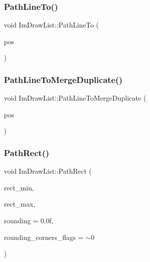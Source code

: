 \hypertarget{struct_im_draw_list_a828d944325ed58d8b57abd3647bffaaf}{}\label{struct_im_draw_list_a828d944325ed58d8b57abd3647bffaaf} 
\subsubsection{\texorpdfstring{Path\+Line\+To()}{PathLineTo()}}
{\footnotesize\ttfamily void Im\+Draw\+List\+::\+Path\+Line\+To (\begin{DoxyParamCaption}\item[{const \hyperlink{struct_im_vec2}{Im\+Vec2} \&}]{pos }\end{DoxyParamCaption})}

\hypertarget{struct_im_draw_list_aa3dd11945fb62495f8b9e1392ed724e3}{}\label{struct_im_draw_list_aa3dd11945fb62495f8b9e1392ed724e3} 
\subsubsection{\texorpdfstring{Path\+Line\+To\+Merge\+Duplicate()}{PathLineToMergeDuplicate()}}
{\footnotesize\ttfamily void Im\+Draw\+List\+::\+Path\+Line\+To\+Merge\+Duplicate (\begin{DoxyParamCaption}\item[{const \hyperlink{struct_im_vec2}{Im\+Vec2} \&}]{pos }\end{DoxyParamCaption})}

\hypertarget{struct_im_draw_list_a1b63e7c7bbb70f8a7be2b227a3d3f802}{}\label{struct_im_draw_list_a1b63e7c7bbb70f8a7be2b227a3d3f802} 
\subsubsection{\texorpdfstring{Path\+Rect()}{PathRect()}}
{\footnotesize\ttfamily void Im\+Draw\+List\+::\+Path\+Rect (\begin{DoxyParamCaption}\item[{const \hyperlink{struct_im_vec2}{Im\+Vec2} \&}]{rect\+\_\+min,  }\item[{const \hyperlink{struct_im_vec2}{Im\+Vec2} \&}]{rect\+\_\+max,  }\item[{float}]{rounding = {\ttfamily 0.0f},  }\item[{int}]{rounding\+\_\+corners\+\_\+flags = {\ttfamily $\sim$0} }\end{DoxyParamCaption})}

